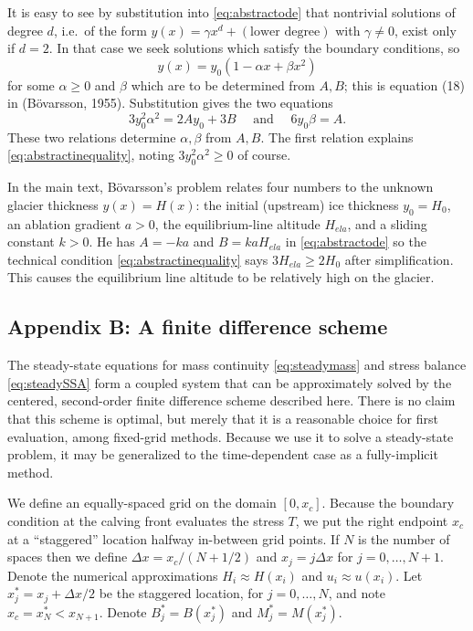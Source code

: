 \documentclass[review,letterpaper]{igs}
\renewcommand{\dh}{\fontencoding{T1}\selectfont{\symbol{240}}}
\newcommand{\bod}{B\"o\dh varsson\xspace}
\newcommand{\citepbod}{(B\"o\dh varsson, 1955)\nocite{Bodvardsson}}
\begin{document}
It is easy to see by substitution into \eqref{eq:abstractode} that nontrivial solutions of degree $d$, i.e.~of the form $y(x) = \gamma x^d + (\text{lower degree})$ with $\gamma\ne 0$, exist only if $d=2$.  In that case we seek solutions which satisfy the boundary conditions, so
\begin{equation}
y(x) = y_0(1 - \alpha x + \beta x^2)  \label{eq:abstractsoln}
\end{equation}
for some $\alpha\ge 0$ and $\beta$ which are to be determined from $A,B$; this is equation (18) in \citepbod.  Substitution gives the two equations
\begin{equation}
3 y_0^2 \alpha^2 = 2 A y_0 + 3 B \quad \text{ and } \quad 6 y_0 \beta = A.  \label{eq:abstractrelations}
\end{equation}
These two relations determine $\alpha,\beta$ from $A,B$.  The first relation explains \eqref{eq:abstractinequality}, noting $3 y_0^2 \alpha^2 \ge 0$ of course.

In the main text, \bod's problem relates four numbers to the unknown glacier thickness $y(x)=H(x)$: the initial (upstream) ice thickness $y_0=H_0$, an ablation gradient $a>0$, the equilibrium-line altitude $H_{ela}$, and a sliding constant $k>0$.  He has $A=-ka$ and $B=k a H_{ela}$ in \eqref{eq:abstractode} so the technical condition \eqref{eq:abstractinequality} says $3 H_{ela} \ge 2 H_0$ after simplification.  This causes the equilibrium line altitude to be relatively high on the glacier.


\subsection{Appendix B: A finite difference scheme}  The steady-state equations for mass continuity \eqref{eq:steadymass} and stress balance \eqref{eq:steadySSA} form a coupled system that can be approximately solved by the centered, second-order finite difference scheme described here.  There is no claim that this scheme is optimal, but merely that it is a reasonable choice for first evaluation, among fixed-grid methods.  Because we use it to solve a steady-state problem, it may be generalized to the time-dependent case as a fully-implicit method.

We define an equally-spaced grid on the domain $[0,x_c]$.  Because the boundary condition at the calving front evaluates the stress $T$, we put the right endpoint $x_c$ at a ``staggered'' location halfway in-between grid points.  If $N$ is the number of spaces then we define $\Delta x = x_c / (N+1/2)$ and $x_j = j\Delta x$ for $j=0,\dots,N+1$.  Denote the numerical approximations $H_i\approx H(x_i)$ and $u_i \approx u(x_i)$.  Let $x_j^* = x_j + \Delta x/2$ be the staggered location, for $j=0,\dots,N$, and note $x_c = x_N^* < x_{N+1}$.  Denote $B_j^*=B(x_j^*)$ and $M_j^*=M(x_j^*)$.
\end{document}
